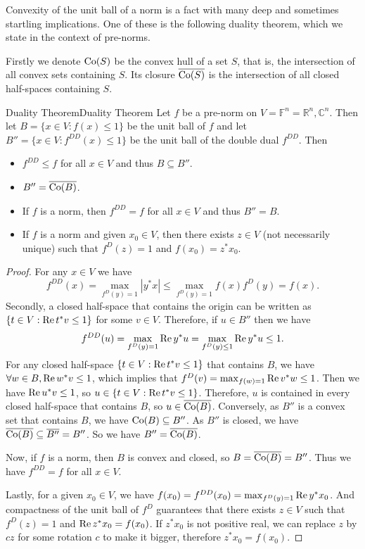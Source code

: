 \documentclass[../main.tex]{subfiles}
\begin{document}
Convexity of the unit ball of a norm is a fact with many deep and sometimes startling implications. One of these is the following duality theorem, which we state in the context of pre-norms.

Firstly we denote $\operatorname{Co}(S)$ be the convex hull of a set $S$, that is, the intersection of all convex sets containing $S$. Its closure $\overline{\operatorname{Co}(S)}$ is the intersection of all closed half-spaces containing $S$.


\begin{theorem}{Duality Theorem}{Duality Theorem}
  Let $f$ be a pre-norm on $V = \mathbb{F}^n = \mathbb{R}^n, \mathbb{C}^n$. Then let $B = \{x \in V: f(x) \leq 1\}$ be the unit ball of $f$ and let $B'' = \{x \in V: f^{DD}(x) \leq 1\}$ be the unit ball of the double dual $f^{DD}$. Then
  \begin{itemize}
    \item $f^{DD} \leq f$ for all $x \in V$ and thus $B \subseteq B''$.
    \item $B'' = \overline{\operatorname{Co}(B)}$.
    \item If $f$ is a norm, then $f^{DD} = f$ for all $x \in V$ and thus $B'' = B$.
    \item If $f$ is a norm and given $x_0\in V$, then there exists $z\in V$ (not necessarily unique) such that $f^D(z) = 1$ and $f(x_0) = z^* x_0$.
  \end{itemize}
\end{theorem}
\begin{proof}
  For any $x\in V$ we have
  \begin{equation*}
    f^{DD}(x) = \max_{f^D(y) = 1} |y^* x| \leq \max_{f^D(y) = 1} f(x) f^D(y) = f(x).
  \end{equation*}
  Secondly, a closed half-space that contains the origin can be written as $\{t\in V: \operatorname{Re} t^*v \leq 1\}$ for some $v \in V$. Therefore, if $u\in B''$ then we have
  \begin{equation*}
    f^{DD}(u) = \max_{f^D(y) = 1} \operatorname{Re} y^* u = \max_{f^D(y) \leq 1} \operatorname{Re} y^* u \leq 1.
  \end{equation*}
  For any closed half-space $\{t\in V: \operatorname{Re} t^*v \leq 1\}$ that contains $B$, we have $\forall w\in B, \operatorname{Re} w^* v \leq 1$, which implies that $f^D(v) = \max_{f(w) = 1} \operatorname{Re} v^* w \leq 1$. Then we have $\operatorname{Re} u^* v \leq 1$, so $u \in \{t\in V: \operatorname{Re} t^*v \leq 1\}$. Therefore, $u$ is contained in every closed half-space that contains $B$, so $u \in \overline{\operatorname{Co}(B)}$. Conversely, as $B''$ is a convex set that contains $B$, we have $\operatorname{Co}(B) \subseteq B''$. As $B''$ is closed, we have $\overline{\operatorname{Co}(B)} \subseteq \overline{B''} = B''$. So we have $B'' = \overline{\operatorname{Co}(B)}$.

  Now, if $f$ is a norm, then $B$ is convex and closed, so $B = \overline{\operatorname{Co}(B)} = B''$. Thus we have $f^{DD} = f$ for all $x \in V$.

  Lastly, for a given $x_0 \in V$, we have $f(x_0) = f^{DD}(x_0) = \max_{f^D(y) = 1} \operatorname{Re} y^* x_0$. And compactness of the unit ball of $f^D$ guarantees that there exists $z \in V$ such that $f^D(z) = 1$ and $\operatorname{Re} z^* x_0 = f(x_0)$. If $z^* x_0$ is not positive real, we can replace $z$ by $c z$ for some rotation $c$ to make it bigger, therefore $z^* x_0 = f(x_0)$.
\end{proof}
\end{document}
